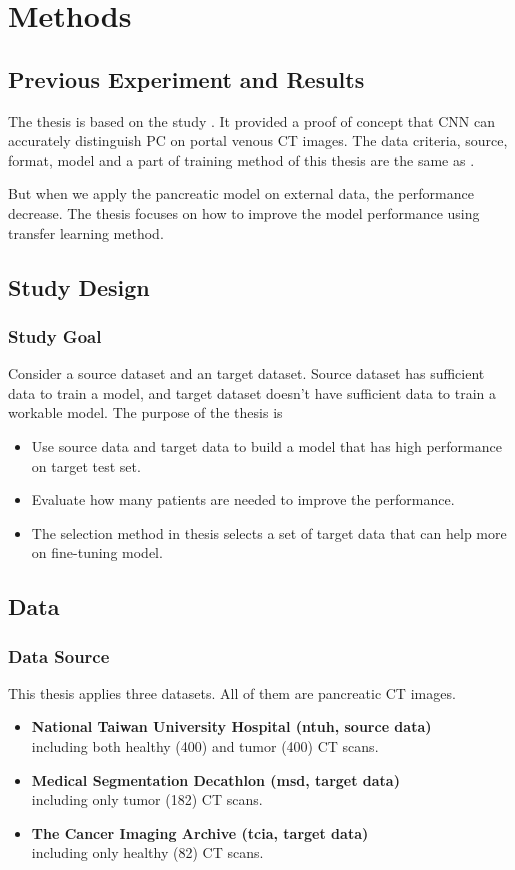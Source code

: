 \chapter{Methods}
 
\section{Previous Experiment and Results}
The thesis is based on the study \cite{liu2020deep}. It provided a proof of concept that CNN can accurately distinguish PC on portal venous CT images. The data criteria, source, format, model and a part of training method of this thesis are the same as \cite{liu2020deep}.

But when we apply the pancreatic model on external data, the performance decrease. The thesis focuses on how to improve the model performance using transfer learning method.


\section{Study Design}
\subsection{Study Goal}
Consider a source dataset and an target dataset. Source dataset has sufficient data to train a model, and target dataset doesn't have sufficient data to train a workable model. The purpose of the thesis is
\begin{itemize}
    \item Use source data and target data to build a model that has high performance on target test set.
    \item Evaluate how many patients are needed to improve the performance.
    \item The selection method in thesis \cite{zhou2017fine} selects a set of target data that can help more on fine-tuning model. 
\end{itemize}


\section{Data}
\subsection{Data Source}
This thesis applies three datasets. All of them are pancreatic CT images.
\begin{itemize}
    \item {\bf National Taiwan University Hospital\cite{liu2020deep} (ntuh, source data)} \\including both healthy (400) and tumor (400) CT scans. 
    \item {\bf Medical Segmentation Decathlon\cite{simpson2019large} (msd, target data)}\\ including only tumor (182) CT scans. 
    \item {\bf The Cancer Imaging Archive\cite{roth} (tcia, target data)}\\ including only healthy (82) CT scans. 
\end{itemize}

